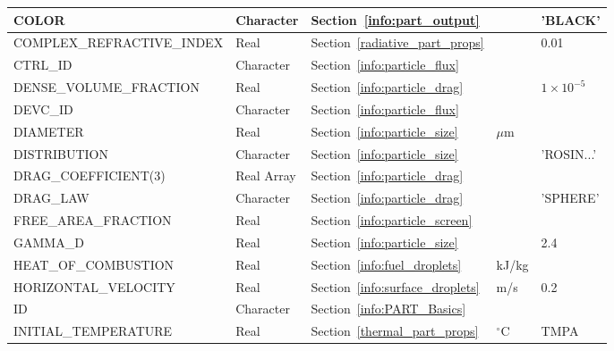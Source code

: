\documentclass[11pt]{book}
\begin{document}
\begin{longtable}{@{\extracolsep{\fill}}|l|l|l|l|l|}
{\ct COLOR}                              & Character       & Section~\ref{info:part_output}          &           & {\ct 'BLACK'} \\ \hline
{\ct COMPLEX\_REFRACTIVE\_INDEX}         & Real            & Section~\ref{radiative_part_props}      &           & 0.01          \\ \hline
{\ct CTRL\_ID}                           & Character       & Section~\ref{info:particle_flux}        &           &               \\ \hline
{\ct DENSE\_VOLUME\_FRACTION}            & Real            & Section~\ref{info:particle_drag}        &           & $1\times 10^{-5}$ \\ \hline
{\ct DEVC\_ID}                           & Character       & Section~\ref{info:particle_flux}        &           &               \\ \hline
{\ct DIAMETER}                           & Real            & Section~\ref{info:particle_size}        & $\mu$m    &               \\ \hline
{\ct DISTRIBUTION}                       & Character       & Section~\ref{info:particle_size}        &           & {\ct 'ROSIN...'} \\ \hline
{\ct DRAG\_COEFFICIENT(3)}               & Real Array      & Section~\ref{info:particle_drag}        &           &               \\ \hline
{\ct DRAG\_LAW}                          & Character       & Section~\ref{info:particle_drag}        &           & {\ct 'SPHERE'}\\ \hline
{\ct FREE\_AREA\_FRACTION}               & Real            & Section~\ref{info:particle_screen}      &           &               \\ \hline
{\ct GAMMA\_D}                           & Real            & Section~\ref{info:particle_size}        &           & 2.4           \\ \hline
{\ct HEAT\_OF\_COMBUSTION}               & Real            & Section~\ref{info:fuel_droplets}        & kJ/kg     &               \\ \hline
{\ct HORIZONTAL\_VELOCITY}               & Real            & Section~\ref{info:surface_droplets}     & m/s       &  0.2          \\ \hline
{\ct ID}                                 & Character       & Section~\ref{info:PART_Basics}          &           &               \\ \hline
{\ct INITIAL\_TEMPERATURE}               & Real            & Section~\ref{thermal_part_props}        & $^\circ$C & {\ct TMPA}    \\ \hline

\end{longtable}
\end{document}
